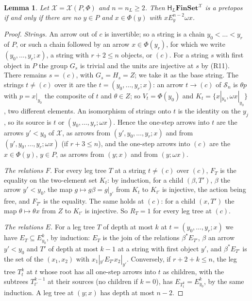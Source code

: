 \documentclass[11pt]{amsart}
\newtheorem{lem}[thm]{Lemma}
\theoremstyle{definition}
\newcommand{\Fin}{\mathbf{FinSet}}
\newcommand{\HH}{\mathsf H}
\newcommand{\cX}{\mathcal X}
\newcommand{\cS}{\mathcal S}
\begin{document}
\begin{lem}\label{lem:cone}
Let $\cX=\cX(P,\Phi)$ and $n=n_L\ge2$. Then $\HH_L\Fin^\cX$ is a
pretopos if and only if there are no $y\in P$ and $x\in\Phi(y)$ with
$x\mathrel{E^{n-2}_y}\omega x$.
\end{lem}
\begin{proof}
\emph{Strings.} An arrow out of $c$ is invertible; so a string is a
chain $y_0<\dots<y_r$ of $P$, or such a chain followed by an arrow
$x\in\Phi(y_r)$, for which we write $(y_0,\dots,y_r;x)$, a string
with $r+2\le n$ objects, or $(c)$. For a string $s$ with first object
in $P$ the group $G_s$ is trivial and the units are injective at $s$
by (R11). There remains $s=(c)$, with $G_s=H_s=Z$; we take it as the
base string. The strings $t\ne(c)$ over it are the
$t=(y_0,\dots,y_r;x)$: an arrow $t\to(c)$ of $\cS_n$ is $\theta p$
with $p=x|_{y_0}$ the composite of $t$ and $\theta\in Z$; so
$V_t=\Phi(y_0)$ and $K_t=\{x|_{y_0},\omega x|_{y_0}\}$, two different
elements. An isomorphism of strings onto $t$ is the identity on the
$y_j$, so its source is $t$ or $(y_0,\dots,y_r;\omega x)$. Hence the
one-step arrows into $t$ are the arrows $y'<y_0$ of $\cX$, as arrows
from $(y',y_0,\dots,y_r;x)$ and from $(y',y_0,\dots,y_r;\omega x)$ (if
$r+3\le n$), and the one-step arrows into $(c)$ are the $x\in\Phi(y)$,
$y\in P$, as arrows from $(y;x)$ and from $(y;\omega x)$.

\emph{The relations $F$.} For every leg tree $T$ at a string $t\ne(c)$
over $(c)$, $F_T$ is the equality on the two-element set $K_t$: by
induction, for a child $(\beta,T')$, $\beta$ the arrow $y'<y_0$, the
map $g\mapsto g\beta=g|_{y'}$ from $K_t$ to $K_{t'}$ is injective, the
action being free, and $F_{T'}$ is the equality. The same holds at
$(c)$: for a child $(x,T')$ the map $\theta\mapsto\theta x$ from $Z$
to $K_{t'}$ is injective. So $R_T=1$ for every leg tree at $(c)$.

\emph{The relations $E$.} For a leg tree $T$ of depth at most $k$ at
$t=(y_0,\dots,y_r;x)$ we have $E_T\subseteq E^k_{y_0}$, by induction:
$E_T$ is the join of the relations $\beta^*E_{T'}$, $\beta$ an arrow
$y'<y_0$ and $T'$ of depth at most $k-1$ at a string with first object
$y'$, and $\beta^*E_{T'}$ is the set of the $(x_1,x_2)$ with
$x_1|_{y'}\mathrel{E_{T'}}x_2|_{y'}$. Conversely, if $r+2+k\le n$, the
leg tree $T^k_t$ at $t$ whose root has all one-step arrows into $t$ as
children, with the subtrees $T^{k-1}_{t'}$ at their sources (no
children if $k=0$), has $E_{T^k_t}=E^k_{y_0}$, by the same induction.
A leg tree at $(y;x)$ has depth at most $n-2$.


\end{proof}
\end{document}
